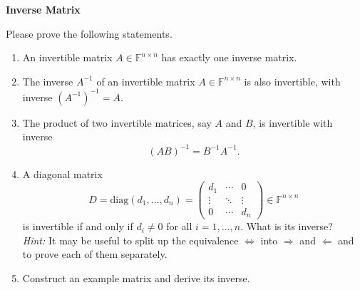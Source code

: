 \textbf{Inverse Matrix} 
 
Please prove the following statements.
 	\begin{enumerate}
		\item An invertible matrix $A\in\mathbb{F}^{n \times n}$ has exactly one inverse matrix.
		\item The inverse $A^{-1}$ of an invertible matrix  $A\in\mathbb{F}^{n \times n}$ is also invertible, with inverse $\left(A^{-1}\right)^{-1} = A$.
		\item The product of two invertible matrices, say $A$ and $B$, is invertible with inverse
		$$(AB)^{-1} = B^{-1}  A^{-1}.$$
		\item A diagonal matrix 
		$$D = \text{diag}(d_1, \ldots, d_n)= \begin{pmatrix}
		d_1 & \cdots&0 \\
		\vdots&\ddots&\vdots\\
		0&\cdots&d_n
		\end{pmatrix}\in\mathbb{F}^{n \times n}$$ is invertible if and only if $d_i \neq 0$ for all $i=1,\ldots, n$. What is its inverse?\\
		\textit{Hint:} It may be useful to split up the equivalence $\Leftrightarrow $ into  $\Rightarrow $ and $\Leftarrow$ and to prove each of them separately.
		\item Construct an example matrix and derive its inverse.
	\end{enumerate}
